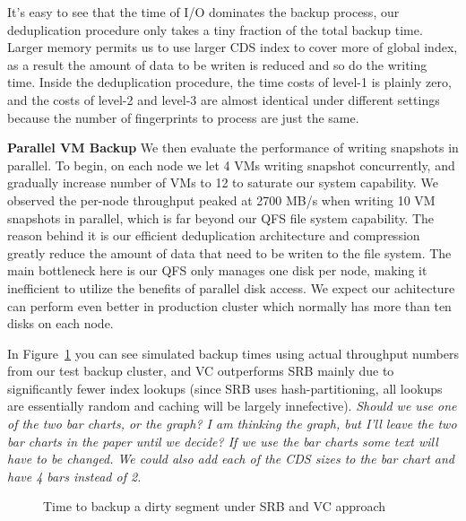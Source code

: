 It's easy to see that the time of I/O dominates the backup process, our deduplication
procedure only takes a tiny fraction of the total backup time. Larger memory permits us to
use larger CDS index to cover more of global index, as a result the amount of data to be writen
is reduced and so do the writing time.
Inside the deduplication procedure, the time costs of level-1
is plainly zero, and the costs of level-2 and level-3 are almost identical under different settings
because the number of fingerprints to process are just the same.

{\bf Parallel VM Backup} We then evaluate the performance of writing snapshots in parallel.
To begin, on each node we let 4 VMs writing snapshot concurrently, and gradually 
increase number of VMs to 12 to saturate our system capability. We observed 
the per-node throughput peaked at 2700 MB/s when writing 10 VM snapshots in parallel, 
which is far beyond our QFS file system capability. The reason behind it is our efficient
deduplication architecture and compression greatly reduce the amount of data that need to be writen to
the file system. The main bottleneck here is our QFS only manages one disk per node, 
making it inefficient to utilize the benefits of parallel disk access. We expect our achitecture can
perform even better in production cluster which normally has more than ten disks on each node.

In Figure~\ref{fig:srb_vs_vc} you
can see simulated backup times using actual throughput numbers from our test
backup cluster, and VC outperforms SRB mainly due to significantly fewer index
lookups (since SRB uses hash-partitioning, all lookups are essentially random
and caching will be largely innefective).  \emph{Should we use one of the two
bar charts, or the graph? I am thinking the graph, but I'll leave the two bar
charts in the paper until we decide? If we use the bar charts some text will
have to be changed. We could also add each of the CDS sizes to the bar chart
and have 4 bars instead of 2.}

\begin{figure}[htbp]
  \centering
  \caption{Time to backup a dirty segment under SRB and VC approach}
  \label{fig:srb_vs_vc}
\end{figure}


